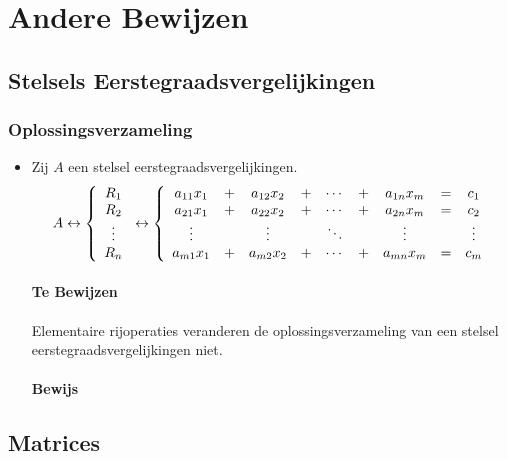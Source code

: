 \documentclass[lineaire_algebra_oplossingen.tex]{subfiles}
\begin{document}
\chapter{Andere Bewijzen}
\section{Stelsels Eerstegraadsvergelijkingen}
\subsection{Oplossingsverzameling}
\begin{itemize}
\item Zij $A$ een stelsel eerstegraadsvergelijkingen.
\[
A \leftrightarrow
\left\{
\begin{array}{c}
R_1\\R_2\\\vdots\\R_n
\end{array}
\right.
\leftrightarrow
\left\{
\begin{array}{c c c c c c c c c }
a_{11}x_1&+&a_{12}x_2 &+& \cdots &+& a_{1n}x_m &=& c_1\\
a_{21}x_1&+&a_{22}x_2 &+& \cdots &+& a_{2n}x_m &=& c_2\\
\vdots & & \vdots & & \ddots & & \vdots &  & \vdots\\
a_{m1}x_1&+&a_{m2}x_2 &+& \cdots &+& a_{mn}x_m &=& c_m\\
\end{array}
\right.
\]
\subsubsection*{Te Bewijzen}
Elementaire rijoperaties veranderen de oplossingsverzameling van een stelsel eerstegraadsvergelijkingen niet.
\subsubsection*{Bewijs}

\end{itemize}


\section{Matrices}
\end{document}
